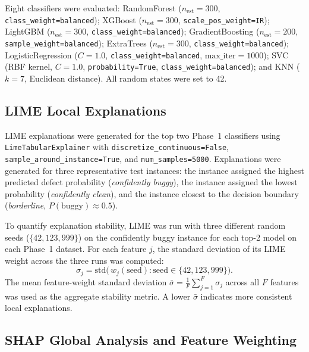 \documentclass[12pt, a4paper]{article}
\newcommand{\model}[1]{\textsf{#1}}
\begin{document}
Eight classifiers were evaluated:
\model{RandomForest} ($n_\text{est}=300$, \texttt{class\_weight=balanced});
\model{XGBoost} ($n_\text{est}=300$, \texttt{scale\_pos\_weight=IR});
\model{LightGBM} ($n_\text{est}=300$, \texttt{class\_weight=balanced});
\model{GradientBoosting} ($n_\text{est}=200$, \texttt{sample\_weight=balanced});
\model{ExtraTrees} ($n_\text{est}=300$, \texttt{class\_weight=balanced});
\model{LogisticRegression} ($C=1.0$, \texttt{class\_weight=balanced},
$\text{max\_iter}=1000$);
\model{SVC} (RBF kernel, $C=1.0$, \texttt{probability=True},
\texttt{class\_weight=balanced}); and
\model{KNN} ($k=7$, Euclidean distance).
All random states were set to 42.

\subsection{LIME Local Explanations}
\label{sec:lime}

LIME explanations were generated for the top two Phase~1 classifiers using
\texttt{LimeTabularExplainer} with
\texttt{discretize\_continuous=False},
\texttt{sample\_around\_instance=True}, and
\texttt{num\_samples=5000}. Explanations were generated for three
representative test instances: the instance assigned the highest predicted
defect probability (\textit{confidently buggy}), the instance assigned the
lowest probability (\textit{confidently clean}), and the instance closest to
the decision boundary (\textit{borderline}, $P(\text{buggy}) \approx 0.5$).

To quantify explanation stability, LIME was run with three different random
seeds ($\{42, 123, 999\}$) on the confidently buggy instance for each top-2
model on each Phase~1 dataset. For each feature $j$, the standard deviation
of its LIME weight across the three runs was computed:
\begin{equation}
  \sigma_j = \mathrm{std}\bigl(\,w_j(\text{seed})
             : \text{seed} \in \{42, 123, 999\}\bigr).
  \label{eq:lime_stability}
\end{equation}
The mean feature-weight standard deviation
$\bar{\sigma} = \frac{1}{F}\sum_{j=1}^{F}\sigma_j$
across all $F$ features was used as the aggregate stability metric.
A lower $\bar{\sigma}$ indicates more consistent local explanations.

\subsection{SHAP Global Analysis and Feature Weighting}
\label{sec:shap}
\end{document}
